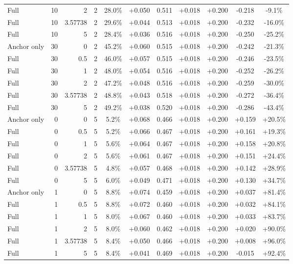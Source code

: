 \begin{table}[htbp]
\begin{tabular}{lrrrccccccc}
Full & 10 & 2 & 2 & 28.0\% & +0.050 & 0.511 & +0.018 & +0.200 & -0.218 & -9.1\% \\
Full & 10 & 3.57738 & 2 & 29.6\% & +0.044 & 0.513 & +0.018 & +0.200 & -0.232 & -16.0\% \\
Full & 10 & 5 & 2 & 28.4\% & +0.036 & 0.516 & +0.018 & +0.200 & -0.250 & -25.2\% \\
Anchor only & 30 & 0 & 2 & 45.2\% & +0.060 & 0.515 & +0.018 & +0.200 & -0.242 & -21.3\% \\
Full & 30 & 0.5 & 2 & 46.0\% & +0.057 & 0.515 & +0.018 & +0.200 & -0.246 & -23.5\% \\
Full & 30 & 1 & 2 & 48.0\% & +0.054 & 0.516 & +0.018 & +0.200 & -0.252 & -26.2\% \\
Full & 30 & 2 & 2 & 47.2\% & +0.048 & 0.516 & +0.018 & +0.200 & -0.259 & -30.0\% \\
Full & 30 & 3.57738 & 2 & 48.8\% & +0.043 & 0.518 & +0.018 & +0.200 & -0.272 & -36.4\% \\
Full & 30 & 5 & 2 & 49.2\% & +0.038 & 0.520 & +0.018 & +0.200 & -0.286 & -43.4\% \\
Anchor only & 0 & 0 & 5 & 5.2\% & +0.068 & 0.466 & +0.018 & +0.200 & +0.159 & +20.5\% \\
Full & 0 & 0.5 & 5 & 5.2\% & +0.066 & 0.467 & +0.018 & +0.200 & +0.161 & +19.3\% \\
Full & 0 & 1 & 5 & 5.6\% & +0.064 & 0.467 & +0.018 & +0.200 & +0.158 & +20.8\% \\
Full & 0 & 2 & 5 & 5.6\% & +0.061 & 0.467 & +0.018 & +0.200 & +0.151 & +24.4\% \\
Full & 0 & 3.57738 & 5 & 4.8\% & +0.057 & 0.468 & +0.018 & +0.200 & +0.142 & +28.9\% \\
Full & 0 & 5 & 5 & 6.0\% & +0.049 & 0.471 & +0.018 & +0.200 & +0.130 & +34.7\% \\
Anchor only & 1 & 0 & 5 & 8.8\% & +0.074 & 0.459 & +0.018 & +0.200 & +0.037 & +81.4\% \\
Full & 1 & 0.5 & 5 & 8.8\% & +0.072 & 0.460 & +0.018 & +0.200 & +0.032 & +84.1\% \\
Full & 1 & 1 & 5 & 8.0\% & +0.067 & 0.460 & +0.018 & +0.200 & +0.033 & +83.7\% \\
Full & 1 & 2 & 5 & 8.0\% & +0.060 & 0.462 & +0.018 & +0.200 & +0.020 & +90.0\% \\
Full & 1 & 3.57738 & 5 & 8.4\% & +0.050 & 0.466 & +0.018 & +0.200 & +0.008 & +96.0\% \\
Full & 1 & 5 & 5 & 8.4\% & +0.041 & 0.469 & +0.018 & +0.200 & -0.015 & +92.4\% \\

\end{tabular}
\end{table}

